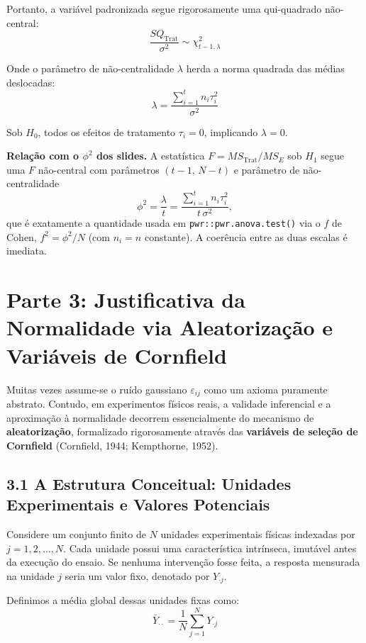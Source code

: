 \documentclass[
]{article}
\begin{document}
Portanto, a variável padronizada segue rigorosamente uma qui-quadrado
não-central:
\[\frac{SQ_{\text{Trat}}}{\sigma^2} \sim \chi^2_{t-1, \lambda}\]

Onde o parâmetro de não-centralidade \(\lambda\) herda a norma quadrada
das médias deslocadas:
\[\lambda = \frac{\sum_{i=1}^{t} n_i \tau_i^2}{\sigma^2}\]

Sob \(H_0\), todos os efeitos de tratamento \(\tau_i = 0\), implicando
\(\lambda = 0\).

\textbf{Relação com o \(\phi^2\) dos slides.} A estatística
\(F = MS_{\text{Trat}}/MS_E\) sob \(H_1\) segue uma \(F\) não-central
com parâmetros \((t-1,\,N-t)\) e parâmetro de não-centralidade
\[\phi^2 = \frac{\lambda}{t} = \frac{\sum_{i=1}^{t} n_i \tau_i^2}{t\,\sigma^2},\]
que é exatamente a quantidade usada em \texttt{pwr::pwr.anova.test()}
via o \(f\) de Cohen, \(f^2 = \phi^2/N\) (com \(n_i=n\) constante). A
coerência entre as duas escalas é imediata.

\section{Parte 3: Justificativa da Normalidade via Aleatorização e
Variáveis de
Cornfield}\label{parte-3-justificativa-da-normalidade-via-aleatorizauxe7uxe3o-e-variuxe1veis-de-cornfield}

Muitas vezes assume-se o ruído gaussiano \(\varepsilon_{ij}\) como um
axioma puramente abstrato. Contudo, em experimentos físicos reais, a
validade inferencial e a aproximação à normalidade decorrem
essencialmente do mecanismo de \textbf{aleatorização}, formalizado
rigorosamente através das \textbf{variáveis de seleção de Cornfield}
(Cornfield, 1944; Kempthorne, 1952).

\subsection{3.1 A Estrutura Conceitual: Unidades Experimentais e Valores
Potenciais}\label{a-estrutura-conceitual-unidades-experimentais-e-valores-potenciais}

Considere um conjunto finito de \(N\) unidades experimentais físicas
indexadas por \(j = 1, 2, \dots, N\). Cada unidade possui uma
característica intrínseca, imutável antes da execução do ensaio. Se
nenhuma intervenção fosse feita, a resposta mensurada na unidade \(j\)
seria um valor fixo, denotado por \(Y_{\cdot j}\).

Definimos a média global dessas unidades fixas como:
\[\bar Y_{\cdot\cdot} = \frac{1}{N} \sum_{j=1}^{N} Y_{\cdot j}\]
\end{document}
